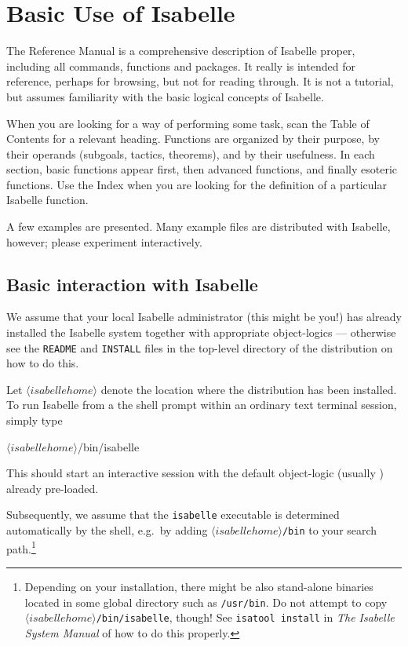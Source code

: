 

\chapter{Basic Use of Isabelle} 
The Reference Manual is a comprehensive description of Isabelle
proper, including all \ML{} commands, functions and packages.  It
really is intended for reference, perhaps for browsing, but not for
reading through.  It is not a tutorial, but assumes familiarity with
the basic logical concepts of Isabelle.

When you are looking for a way of performing some task, scan the Table of
Contents for a relevant heading.  Functions are organized by their purpose,
by their operands (subgoals, tactics, theorems), and by their usefulness.
In each section, basic functions appear first, then advanced functions, and
finally esoteric functions.  Use the Index when you are looking for the
definition of a particular Isabelle function.

A few examples are presented.  Many example files are distributed with
Isabelle, however; please experiment interactively.


\section{Basic interaction with Isabelle}
\nobreak
%
We assume that your local Isabelle administrator (this might be you!) has
already installed the Isabelle system together with appropriate object-logics
--- otherwise see the \texttt{README} and \texttt{INSTALL} files in the
top-level directory of the distribution on how to do this.

\medskip Let $\langle isabellehome \rangle$ denote the location where
the distribution has been installed.  To run Isabelle from a the shell
prompt within an ordinary text terminal session, simply type
\begin{ttbox}
\({\langle}isabellehome{\rangle}\)/bin/isabelle
\end{ttbox}
This should start an interactive \ML{} session with the default object-logic
(usually {\HOL}) already pre-loaded.

Subsequently, we assume that the \texttt{isabelle} executable is determined
automatically by the shell, e.g.\ by adding {\tt \(\langle isabellehome
  \rangle\)/bin} to your search path.\footnote{Depending on your installation,
  there might be also stand-alone binaries located in some global directory
  such as \texttt{/usr/bin}.  Do not attempt to copy {\tt \(\langle
    isabellehome \rangle\)/bin/isabelle}, though!  See \texttt{isatool
    install} in \emph{The Isabelle System Manual} of how to do this properly.}

